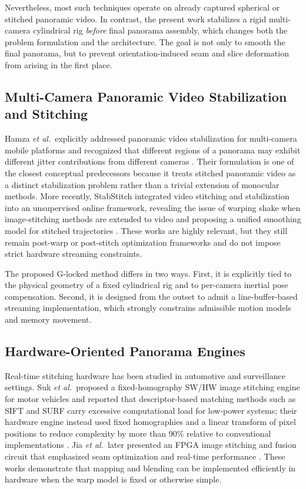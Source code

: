 \documentclass[journal]{IEEEtran}
\newcommand{\etal}{\textit{et al.}}
\begin{document}
Nevertheless, most such techniques operate on already captured spherical or stitched panoramic video. In contrast, the present work stabilizes a rigid multi-camera cylindrical rig \emph{before} final panorama assembly, which changes both the problem formulation and the architecture. The goal is not only to smooth the final panorama, but to prevent orientation-induced seam and slice deformation from arising in the first place.

\subsection{Multi-Camera Panoramic Video Stabilization and Stitching}
Hamza \etal\ explicitly addressed panoramic video stabilization for multi-camera mobile platforms and recognized that different regions of a panorama may exhibit different jitter contributions from different cameras \cite{hamza2015panovideo}. Their formulation is one of the closest conceptual predecessors because it treats stitched panoramic video as a distinct stabilization problem rather than a trivial extension of monocular methods. More recently, StabStitch integrated video stitching and stabilization into an unsupervised online framework, revealing the issue of warping shake when image-stitching methods are extended to video and proposing a unified smoothing model for stitched trajectories \cite{nie2024stabstitch}. These works are highly relevant, but they still remain post-warp or post-stitch optimization frameworks and do not impose strict hardware streaming constraints.

The proposed G-locked method differs in two ways. First, it is explicitly tied to the physical geometry of a fixed cylindrical rig and to per-camera inertial pose compensation. Second, it is designed from the outset to admit a line-buffer-based streaming implementation, which strongly constrains admissible motion models and memory movement.

\subsection{Hardware-Oriented Panorama Engines}
Real-time stitching hardware has been studied in automotive and surveillance settings. Suk \etal\ proposed a fixed-homography SW/HW image stitching engine for motor vehicles and reported that descriptor-based matching methods such as SIFT and SURF carry excessive computational load for low-power systems; their hardware engine instead used fixed homographies and a linear transform of pixel positions to reduce complexity by more than 90\% relative to conventional implementations \cite{suk2015hwstitch}. Jia \etal\ later presented an FPGA image stitching and fusion circuit that emphasized seam optimization and real-time performance \cite{jia2024fpga}. These works demonstrate that mapping and blending can be implemented efficiently in hardware when the warp model is fixed or otherwise simple.
\end{document}
